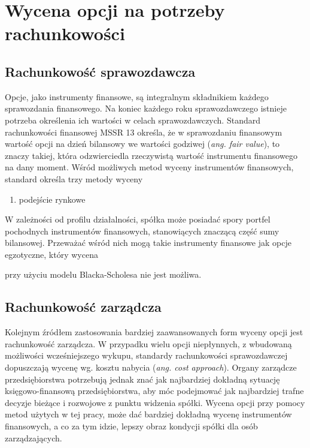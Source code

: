 \documentclass{pracamgr}
\begin{document}
\section{Wycena opcji na potrzeby rachunkowości}
\label{sec:aspekty_finansowe}

\subsection{Rachunkowość sprawozdawcza} %
\label{sub:rachunkowosc_sprawozdawcza}
Opcje, jako instrumenty finansowe, są integralnym składnikiem każdego sprawozdania finansowego. Na koniec 
każdego roku sprawozdawczego istnieje potrzeba określenia ich wartości w celach sprawozdawczych.
Standard rachunkowości finansowej MSSR 13 określa, że w sprawozdaniu finansowym wartość opcji na dzień 
bilansowy we wartości godziwej (\textit{ang. fair value}), to znaczy takiej, która odzwierciedla
rzeczywistą wartość instrumentu finansowego na dany moment. Wśród możliwych metod wyceny instrumentów finansowych, 
standard określa trzy metody wyceny 
\begin{enumerate}
  \item podejście rynkowe 
\end{enumerate}
W zależności od profilu działalności, spółka może posiadać spory portfel pochodnych instrumentów finansowych, stanowiących znaczącą
część sumy bilansowej. Przeważać wśród nich mogą takie instrumenty finansowe jak opcje egzotyczne, który wycena 

przy użyciu modelu Blacka-Scholesa nie jest możliwa. 


\subsection{Rachunkowość zarządcza} %
\label{sub:RachunkowoscZarzadcza}
Kolejnym źródłem zastosowania bardziej zaawansowanych form wyceny opcji jest rachunkowość zarządcza. 
W przypadku wielu opcji niepłynnych, z wbudowaną możliwości wcześniejszego wykupu, standardy rachunkowości sprawozdawczej dopuszczają
wycenę wg. kosztu nabycia (\textit{ang. cost approach}). Organy zarządcze 
przedsiębiorstwa potrzebują jednak znać jak najbardziej dokładną sytuację księgowo-finansową przedsiębiorstwa, aby móc podejmować
jak najbardziej trafne decyzje bieżące i rozwojowe z punktu widzenia spółki. 
Wycena opcji przy pomocy metod użytych w tej pracy, może dać bardziej dokładną wycenę instrumentów 
finansowych, a co za tym idzie, lepszy obraz kondycji spółki dla osób zarządzających.  
\end{document}
